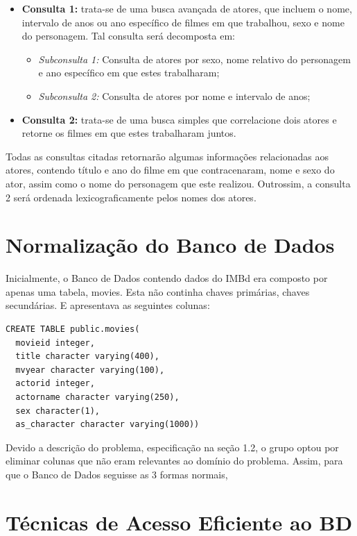 \documentclass[
	12pt,				%
	oneside,			%
	a4paper,			%
	brazil				%
	]{abntex2}
\begin{document}
\begin{itemize}

\item \textbf{Consulta 1:} trata-se de uma busca avançada de atores, que incluem o nome, intervalo de anos ou ano específico de filmes em que trabalhou, sexo e nome do personagem. Tal consulta será decomposta em:
\begin{itemize}
\item\textit{ Subconsulta 1:} Consulta de atores por sexo, nome relativo do personagem e ano específico em que estes trabalharam;
\item \textit{Subconsulta 2:} Consulta de atores por nome e intervalo de anos;
\end{itemize}
\item \textbf{Consulta 2:} trata-se de uma busca simples que correlacione dois atores e retorne os filmes em que estes trabalharam juntos.
\end{itemize}

Todas as consultas citadas retornarão algumas informações relacionadas aos atores, contendo título e ano do filme em que contracenaram, nome e sexo do ator, assim como o nome do personagem que este realizou. Outrossim, a consulta 2 será ordenada lexicograficamente pelos nomes dos atores.



\chapter{Normalização do Banco de Dados}

Inicialmente, o Banco de Dados contendo dados do IMBd era composto por apenas uma tabela, movies. Esta não continha chaves primárias, chaves secundárias. E apresentava as seguintes colunas: 

\begin{lstlisting}
CREATE TABLE public.movies(
  movieid integer,
  title character varying(400),
  mvyear character varying(100),
  actorid integer,
  actorname character varying(250),
  sex character(1),
  as_character character varying(1000))
\end{lstlisting}

Devido a descrição do problema, especificação na seção 1.2, o grupo optou por eliminar colunas que não eram relevantes ao domínio do problema. Assim, para que o Banco de Dados seguisse as 3 formas normais,  


\chapter{Técnicas de Acesso Eficiente ao BD}
\end{document}

